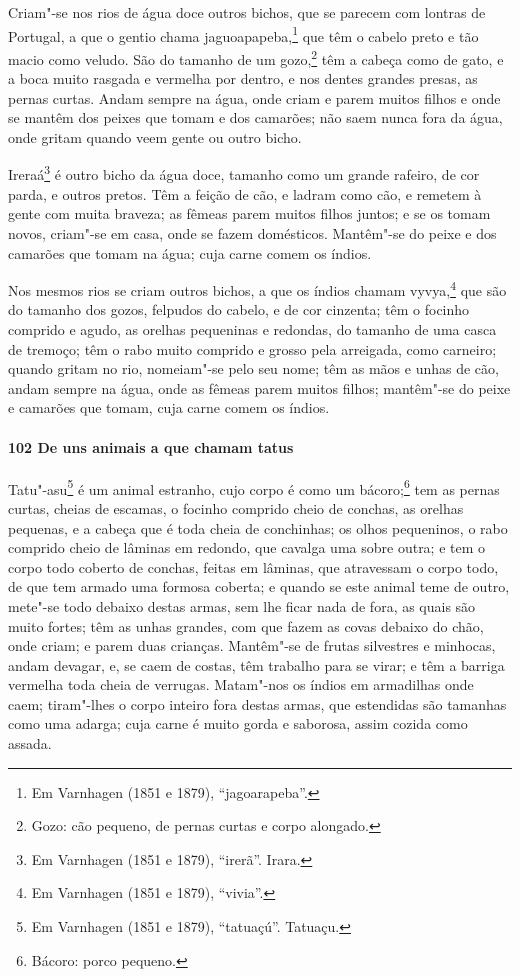 \begin{linenumbers}
Criam"-se nos rios de água doce outros bichos, que se parecem com lontras de Portugal, a
que o gentio chama jaguoapapeba,\footnote{ Em Varnhagen (1851 e 1879), ``jagoarapeba''.}
que têm o cabelo preto e tão macio como veludo. São do tamanho de um gozo,\footnote{ Gozo:
cão pequeno, de pernas curtas e corpo alongado.} têm a cabeça como de gato, e a boca
muito rasgada e vermelha por dentro, e nos dentes grandes presas, as pernas curtas. Andam
sempre na água, onde criam e parem muitos filhos e onde se mantêm dos peixes que tomam e
dos camarões; não saem nunca fora da água, onde gritam quando veem gente ou outro bicho.

Ireraá\footnote{ Em Varnhagen (1851 e 1879), ``irerã''. Irara.} é outro bicho da água
doce, tamanho como um grande rafeiro, de cor parda, e outros pretos. Têm a feição de cão,
e ladram como cão, e remetem à gente com muita braveza; as fêmeas parem muitos filhos
juntos; e se os tomam novos, criam"-se em casa, onde se fazem domésticos. Mantêm"-se do
peixe e dos camarões que tomam na água; cuja carne comem os índios.

Nos mesmos rios se criam outros bichos, a que os índios chamam vyvya,\footnote{ Em
Varnhagen (1851 e 1879), ``vivia''.} que são do tamanho dos gozos, felpudos do cabelo, e
de cor cinzenta; têm o focinho comprido e agudo, as orelhas pequeninas e redondas, do
tamanho de uma casca de tremoço; têm o rabo muito comprido e grosso pela arreigada, como
carneiro; quando gritam no rio, nomeiam"-se pelo seu nome; têm as mãos e unhas de cão,
andam sempre na água, onde as fêmeas parem muitos filhos; mantêm"-se do peixe e camarões
que tomam, cuja carne comem os índios.

\paragraph{102 De uns animais a que chamam tatus}\quad
Tatu"-asu\footnote{ Em Varnhagen (1851 e 1879), ``tatuaçú''. Tatuaçu.} é um animal
estranho, cujo corpo é como um bácoro;\footnote{ Bácoro: porco pequeno.} tem as pernas
curtas, cheias de escamas, o focinho comprido cheio de conchas, as orelhas pequenas, e a
cabeça que é toda cheia de conchinhas; os olhos pequeninos, o rabo comprido cheio de
lâminas em redondo, que cavalga uma sobre outra; e tem o corpo todo coberto de conchas,
feitas em lâminas, que atravessam o corpo todo, de que tem armado uma formosa coberta; e
quando se este animal teme de outro, mete"-se todo debaixo destas armas, sem lhe ficar nada
de fora, as quais são muito fortes; têm as unhas grandes, com que fazem as covas debaixo
do chão, onde criam; e parem duas crianças. Mantêm"-se de frutas silvestres e minhocas,
andam devagar, e, se caem de costas, têm trabalho para se virar; e têm a barriga vermelha
toda cheia de verrugas. Matam"-nos os índios em armadilhas onde caem; tiram"-lhes o corpo
inteiro fora destas armas, que estendidas são tamanhas como uma adarga; cuja carne é muito
gorda e saborosa, assim cozida como assada.


\end{linenumbers}

